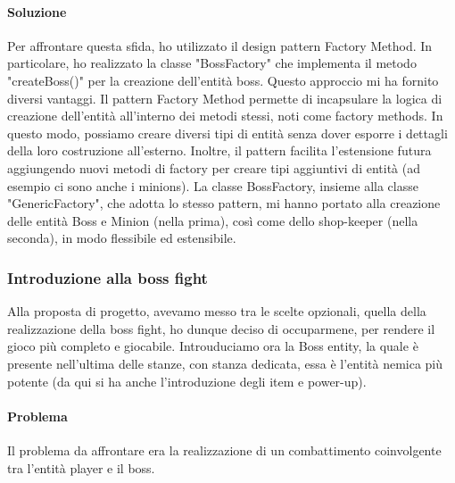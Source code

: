\documentclass[a4paper,12pt]{report}
\begin{document}
\paragraph*{Soluzione}
Per affrontare questa sfida, ho utilizzato il design pattern Factory Method.
In particolare, ho realizzato la classe "BossFactory" che implementa il metodo "createBoss()" per la creazione dell'entità boss.
Questo approccio mi ha fornito diversi vantaggi.
Il pattern Factory Method permette di incapsulare la logica di creazione dell'entità all'interno dei metodi stessi, noti come factory methods.
In questo modo, possiamo creare diversi tipi di entità senza dover esporre i dettagli della loro costruzione all'esterno.
Inoltre, il pattern facilita l'estensione futura aggiungendo nuovi metodi di factory per creare tipi aggiuntivi di entità (ad esempio ci sono anche i minions). 
La classe BossFactory, insieme alla classe "GenericFactory", che adotta lo stesso pattern, mi hanno portato alla creazione delle entità Boss e Minion (nella prima), così come dello shop-keeper (nella seconda), in modo flessibile ed estensibile.
\subsubsection*{Introduzione alla boss fight}
Alla proposta di progetto, avevamo messo tra le scelte opzionali, quella della realizzazione della boss fight, ho dunque deciso di occuparmene, per rendere il gioco più completo e giocabile.
Introuduciamo ora la Boss entity, la quale è presente nell'ultima delle stanze, con stanza dedicata, essa è l'entità nemica più potente (da qui si ha anche l'introduzione degli item e power-up). 
\paragraph*{Problema}
Il problema da affrontare era la realizzazione di un combattimento coinvolgente tra l'entità player e il boss.
\end{document}

